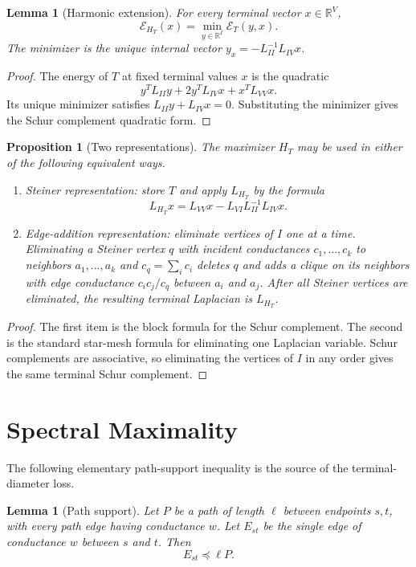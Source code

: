 \documentclass[11pt]{article}
\newtheorem{lemma}[theorem]{Lemma}
\newtheorem{proposition}[theorem]{Proposition}
\newcommand{\R}{\mathbb{R}}
\newcommand{\E}{\mathcal{E}}
\begin{document}
\begin{lemma}[Harmonic extension]
\label{lem:harmonic}
For every terminal vector $x\in\R^V$,
\[
  \E_{H_T}(x)
  =
  \min_{y\in\R^I}
  \E_T(y,x).
\]
The minimizer is the unique internal vector
$y_x=-L_{II}^{-1}L_{IV}x$.
\end{lemma}

\begin{proof}
The energy of $T$ at fixed terminal values $x$ is the quadratic
\[
  y^T L_{II}y+2y^TL_{IV}x+x^TL_{VV}x .
\]
Its unique minimizer satisfies $L_{II}y+L_{IV}x=0$.  Substituting the
minimizer gives the Schur complement quadratic form.
\end{proof}

\begin{proposition}[Two representations]
\label{prop:representations}
The maximizer $H_T$ may be used in either of the following equivalent ways.
\begin{enumerate}
\item Steiner representation: store $T$ and apply $L_{H_T}$ by the formula
\[
  L_{H_T}x=L_{VV}x-L_{VI}L_{II}^{-1}L_{IV}x .
\]
\item Edge-addition representation: eliminate vertices of $I$ one at a time.
Eliminating a Steiner vertex $q$ with incident conductances
$c_1,\ldots,c_k$ to neighbors $a_1,\ldots,a_k$ and
$c_q=\sum_i c_i$ deletes $q$ and adds a clique on its neighbors with edge
conductance $c_ic_j/c_q$ between $a_i$ and $a_j$.  After all Steiner
vertices are eliminated, the resulting terminal Laplacian is $L_{H_T}$.
\end{enumerate}
\end{proposition}

\begin{proof}
The first item is the block formula for the Schur complement.  The second is
the standard star-mesh formula for eliminating one Laplacian variable.  Schur
complements are associative, so eliminating the vertices of $I$ in any order
gives the same terminal Schur complement.
\end{proof}

\section{Spectral Maximality}

The following elementary path-support inequality is the source of the
terminal-diameter loss.

\begin{lemma}[Path support]
\label{lem:path-support}
Let $P$ be a path of length $\ell$ between endpoints $s,t$, with every path
edge having conductance $w$.  Let $E_{st}$ be the single edge of conductance
$w$ between $s$ and $t$.  Then
\[
  E_{st}\preceq \ell P .
\]
\end{lemma}
\end{document}
